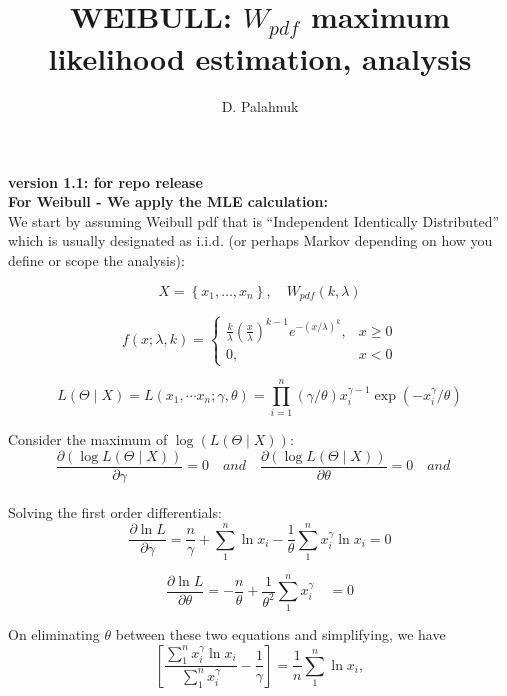 \documentclass[11pt, oneside]{article}	%
\title{WEIBULL: $W_{pdf}$ maximum likelihood estimation, analysis}
\author{D. Palahnuk}
\begin{document}
	\maketitle
	
\textbf{version 1.1: for repo release} \\

\textbf{For Weibull - We apply the MLE calculation:} \\


We start by assuming Weibull pdf that is ``Independent Identically Distributed'' which is usually designated as i.i.d. (or perhaps Markov depending on how you define or scope the analysis): 

$$
X = \left\{x_{1}, \ldots, x_{n}\right\}, \quad W{_{pdf}}(k, \lambda)
$$

$$
f(x ; \lambda, k)= \begin{cases}\frac{k}{\lambda}\left(\frac{x}{\lambda}\right)^{k-1} e^{-(x / \lambda)^{k}}, & x \geq 0 \\ 0, & x<0\end{cases}
$$


$$
L\left(\Theta \mid X \right)= L\left(x_{1}, \cdots x_{n} ; \gamma, \theta\right)=\prod_{i=1}^{n}(\gamma / \theta) x_{i}^{\gamma-1} \exp \left(-x_{i}^{\gamma} / \theta\right)
$$

Consider the maximum of $\log \left(L\left(\Theta \mid X \right)\right)$:\\

$$
\frac{\partial (\log L\left(\Theta \mid X \right))}{\partial \gamma}=0 
\quad and \quad
\frac{\partial (\log L\left(\Theta \mid X \right))}{\partial \theta}=0 
\quad and \quad 
$$\\

Solving the first order differentials:\\

$$
\frac{\partial \ln L}{\partial \gamma}=\frac{n}{\gamma}+\sum_{1}^{n} \ln x_{i}-\frac{1}{\theta} \sum_{1}^{n} x_{i}^{\gamma} \ln x_{i}=0
$$

$$
\frac{\partial \ln L}{\partial \theta}=-\frac{n}{\theta}+\frac{1}{\theta^{2}} \sum_{1}^{n} x_{i}^{\gamma} \quad=0
$$

On eliminating $\theta$ between these two equations and simplifying, we have
$$
\left[\frac{\sum_{1}^{n} x_{i}^{\gamma} \ln x_{i}}{\sum_{1}^{n} x_{i}^{\gamma}}-\frac{1}{\gamma}\right]=\frac{1}{n} \sum_{1}^{n} \ln x_{i},
$$
\end{document}
